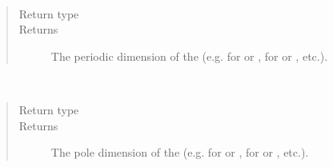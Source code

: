 \documentclass[letterpaper,10pt,english]{sphinxmanual}
\begin{document}
\begin{fulllineitems}
\begin{fulllineitems}
\label{\detokenize{grid:ESMF.api.grid.Grid.periodic_dim}}~\begin{quote}\begin{description}
\item[{Return type}] \leavevmode
{}

\item[{Returns}] \leavevmode
The periodic dimension of the {\hyperref[\detokenize{grid:ESMF.api.grid.Grid}]{}}
(e.g.  for  or ,  for  or
, etc.).

\end{description}\end{quote}

\end{fulllineitems}


\begin{fulllineitems}
\label{\detokenize{grid:ESMF.api.grid.Grid.pole_dim}}~\begin{quote}\begin{description}
\item[{Return type}] \leavevmode
{}

\item[{Returns}] \leavevmode
The pole dimension of the {\hyperref[\detokenize{grid:ESMF.api.grid.Grid}]{}}
(e.g.  for  or ,  for  or
, etc.).

\end{description}\end{quote}

\end{fulllineitems}


\end{fulllineitems}
\end{document}
